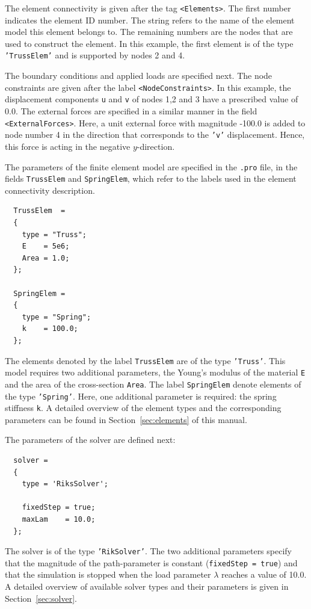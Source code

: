 \documentclass{article}
\newenvironment{graybox}{

\begin{center}\noindent\ignorespaces\begin{Sbox}\begin{minipage}{10cm}}%
{\end{minipage}\end{Sbox}%
\fcolorbox{black}{mygray}{\TheSbox}\vspace{5mm}\ignorespacesafterend\end{center}}
\begin{document}
The element connectivity is given after the tag \texttt{<Elements>}. 
The first number indicates the element ID number. The string refers to the name of the
element model this element belongs to. The remaining numbers are the nodes that are used to construct 
the element. In this example, the first element is of the type \texttt{'TrussElem'} and is supported
by nodes 2 and 4.

The boundary conditions and applied loads are specified next. The node constraints are given after the label \texttt{<NodeConstraints>}. 
In this example, the displacement components \texttt{u} and
\texttt{v} of nodes 1,2 and 3 have a prescribed value of 0.0. The external forces are specified in a 
similar manner in the field \texttt{<ExternalForces>}. Here, a unit external force with magnitude -100.0 is
added to node number 4 in the direction that corresponds to the \texttt{'v'} displacement. Hence, this force is
acting in the negative $y$-direction.

The parameters of the finite element model are specified in the \texttt{.pro} file, 
in the fields \texttt{TrussElem} and \texttt{SpringElem}, which refer to the labels used in the element connectivity
description.

\begin{graybox}
\begin{verbatim}
  TrussElem  = 
  {
    type = "Truss";
    E    = 5e6;
    Area = 1.0;
  };

  SpringElem =
  {
    type = "Spring";
    k    = 100.0;
  };
\end{verbatim}
\end{graybox}
The elements denoted by the label \texttt{TrussElem} are of the type \texttt{'Truss'}. This model requires two
additional parameters, the Young's modulus of the material \texttt{E} and the area of the cross-section \texttt{Area}.
The label \texttt{SpringElem} denote elements of the type \texttt{'Spring'}. Here, one additional parameter is required: the
spring stiffness \texttt{k}. A detailed overview of the element types and the corresponding parameters can be found in Section~\ref{sec:elements}
of this manual.

\vspace{2mm}
\noindent
The parameters of the solver are defined next:

\begin{graybox}
\begin{verbatim}
  solver =
  {
    type = 'RiksSolver';

    fixedStep = true;
    maxLam    = 10.0; 
  };
\end{verbatim}
\end{graybox}
The solver is of the type \texttt{'RikSolver'}. The two additional parameters specify that the magnitude of the path-parameter is
constant (\texttt{fixedStep = true}) and that the simulation is stopped when the load parameter $\lambda$ reaches a value of 10.0. 
A detailed overview of available solver types and their parameters is given in Section~\ref{sec:solver}.
\end{document}

